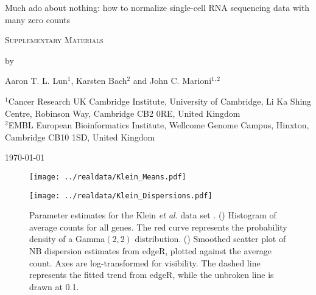 \documentclass{article}
\begin{document}
\begin{titlepage}
\vspace*{3cm}
\begin{center}

{\LARGE
Much ado about nothing: how to normalize single-cell RNA sequencing data with many zero counts
\par}

\vspace{0.75cm}

{\Large 
    \textsc{Supplementary Materials}
\par
}
\vspace{0.75cm}

\large
by

\vspace{0.75cm}
Aaron T. L. Lun$^{1}$, Karsten Bach$^{2}$ and John C. Marioni$^{1,2}$

\vspace{1cm}
\begin{minipage}{0.9\textwidth}
\begin{flushleft} 
$^1$Cancer Research UK Cambridge Institute, University of Cambridge, Li Ka Shing Centre, Robinson Way, Cambridge CB2 0RE, United Kingdom \\[6pt]
$^2$EMBL European Bioinformatics Institute, Wellcome Genome Campus, Hinxton, Cambridge CB10 1SD, United Kingdom \\[6pt]
\end{flushleft}
\end{minipage}

\vspace{1.5cm}
{\large \today{}}

\vspace*{\fill}
\end{center}
\end{titlepage}

\begin{figure}[btp]
    \begin{center}
        \begin{minipage}{0.4\textwidth}
            \texttt{[image: ../realdata/Klein\_Means.pdf]}
            \subcaption{}\label{subfig:kleinmean}
        \end{minipage}
        \begin{minipage}{0.4\textwidth}
            \texttt{[image: ../realdata/Klein\_Dispersions.pdf]}
            \subcaption{}\label{subfig:kleindisp}
        \end{minipage}
    \end{center}
    \caption{
        Parameter estimates for the Klein \textit{et al.} data set \cite{klein2015droplet}.
        () Histogram of average counts for all genes. 
        The red curve represents the probability density of a Gamma$(2, 2)$ distribution.
        () Smoothed scatter plot of NB dispersion estimates from edgeR, plotted against the average count.
        Axes are log-transformed for visibility.
        The dashed line represents the fitted trend from edgeR, while the unbroken line is drawn at 0.1.
    }
\end{figure}
\end{document}
